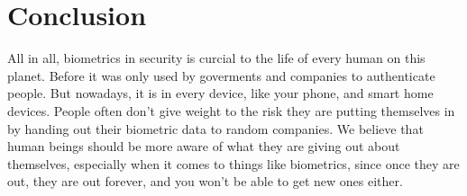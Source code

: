 \documentclass[conference]{IEEEtran}
\begin{document}
\section{Conclusion}

All in all, biometrics in security is curcial to the life of every human on this planet. Before it was only used by goverments and companies to authenticate people. But nowadays, it is in every device, like your phone, and smart home devices. People often don't give weight to the risk they are putting themselves in by handing out their biometric data to random companies. We believe that human beings should be more aware of what they are giving out about themselves, especially when it comes to things like biometrics, since once they are out, they are out forever, and you won't be able to get new ones either.



\end{document}
